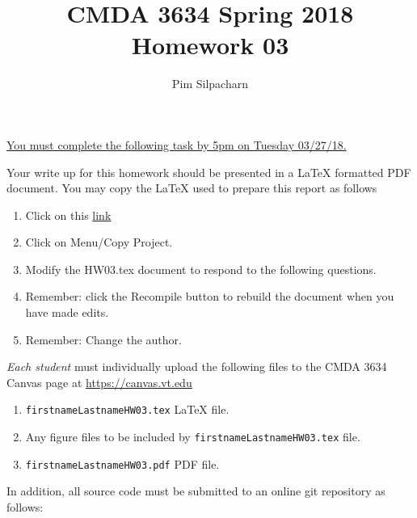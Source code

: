 \documentclass{article}
\newcommand{\pad}{\vspace{8pt}\noindent}
\newcommand{\myhref}[2]{\href{#1}{\color{foo}\underline{#2}\color{black}}}
\begin{document}
\title{CMDA 3634 Spring 2018 Homework 03}

\author{Pim Silpacharn}
\vspace{-64pt}\maketitle
\begin{center}\underline{You must complete the following task by 5pm on Tuesday 03/27/18.}\end{center}
Your write up for this homework should be presented in a {\LaTeX} formatted PDF document. You may copy the \LaTeX{} used to prepare this report as follows

\begin{enumerate}
\item Click on this  \myhref{https://www.sharelatex.com/read/tkfwfqfjqqgs}{link} 
\item Click on Menu/Copy Project.
\item Modify the HW03.tex document to respond to the following questions. 
\item Remember: click the Recompile button to rebuild the document when you have made edits.
\item Remember: Change the author. 

\end{enumerate}

\pad \emph{Each student} must individually upload the following files to the CMDA 3634 Canvas page at \myhref{https://canvas.vt.edu}{https://canvas.vt.edu}

\begin{enumerate}
\item \verb|firstnameLastnameHW03.tex| {\LaTeX} file.
\item Any figure files to be included by \verb|firstnameLastnameHW03.tex| file.
\item \verb|firstnameLastnameHW03.pdf| PDF file.
\end{enumerate}

\noindent In addition, all source code must be submitted to an online git repository as follows:
\end{document}
